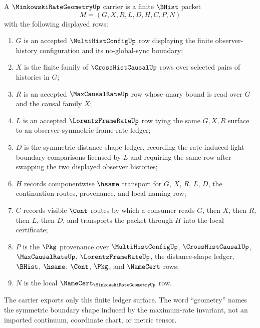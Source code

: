 \begin{definition}
\label{def:minkowski-rate-geometry-carrier}
A $\MinkowskiRateGeometryUp$ carrier is a finite $\BHist$ packet
$$
M=(G,X,R,L,D,H,C,P,N)
$$
with the following displayed rows:
\begin{enumerate}
\item $G$ is an accepted $\MultiHistConfigUp$ row displaying the finite observer-history configuration and its no-global-sync boundary;
\item $X$ is the finite family of $\CrossHistCausalUp$ rows over selected pairs of histories in $G$;
\item $R$ is an accepted $\MaxCausalRateUp$ row whose unary bound is read over $G$ and the causal family $X$;
\item $L$ is an accepted $\LorentzFrameRateUp$ row tying the same $G,X,R$ surface to an observer-symmetric frame-rate ledger;
\item $D$ is the symmetric distance-shape ledger, recording the rate-induced light-boundary comparisons licensed by $L$ and requiring the same row after swapping the two displayed observer histories;
\item $H$ records componentwise $\hsame$ transport for $G$, $X$, $R$, $L$, $D$, the continuation routes, provenance, and local naming row;
\item $C$ records visible $\Cont$ routes by which a consumer reads $G$, then $X$, then $R$, then $L$, then $D$, and transports the packet through $H$ into the local certificate;
\item $P$ is the $\Pkg$ provenance over $\MultiHistConfigUp$, $\CrossHistCausalUp$, $\MaxCausalRateUp$, $\LorentzFrameRateUp$, the distance-shape ledger, $\BHist$, $\hsame$, $\Cont$, $\Pkg$, and $\NameCert$ rows;
\item $N$ is the local $\NameCert_{\MinkowskiRateGeometryUp}$ row.
\end{enumerate}
The carrier exports only this finite ledger surface. The word ``geometry'' names the symmetric boundary shape induced by the maximum-rate invariant, not an imported continuum, coordinate chart, or metric tensor.
\end{definition}

